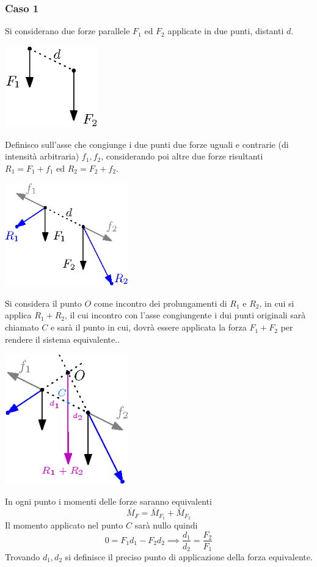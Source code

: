 \documentclass[10pt, letterpaper]{report}
\begin{document}
\subsubsection{Caso 1}
Si considerano due forze parallele $F_1$ ed $F_2$ applicate in due punti, distanti $d$.\begin{center}
    \includegraphics[width=0.3\textwidth ]{images/forzeEq1.eps}
\end{center}
Definisco sull'asse che congiunge i due punti due forze uguali e contrarie (di intensità arbitraria) $f_1,f_2$, 
considerando poi altre due forze risultanti $R_1=F_1+f_1$ ed $R_2=F_2+f_2$.
\begin{center}
    \includegraphics[width=0.4\textwidth ]{images/forzeEq2.eps}
\end{center}
Si considera il punto $O$ come incontro dei prolungamenti di $R_1$ e $R_2$, in cui si applica $R_1+R_2$, il cui incontro con l'asse congiungente i dui punti originali sarà chiamato $C$ e sarà il punto in cui, dovrà essere applicata la forza $F_1+F_2$ per rendere il sistema equivalente..
\begin{center}
    \includegraphics[width=0.4\textwidth ]{images/forzeEq3.eps}
\end{center}
In ogni punto i momenti delle forze saranno equivalenti 
$$ \bar M_F=\bar M_{F_1}+\bar M_{F_2}$$
Il momento applicato nel punto $C$ sarà nullo quindi 
$$ 0=F_1d_1-F_2d_2\implies \frac{d_1}{d_2}=\frac{F_2}{F_1}$$
Trovando $d_1,d_2$ si definisce il preciso punto di applicazione della forza equivalente.
\end{document}
